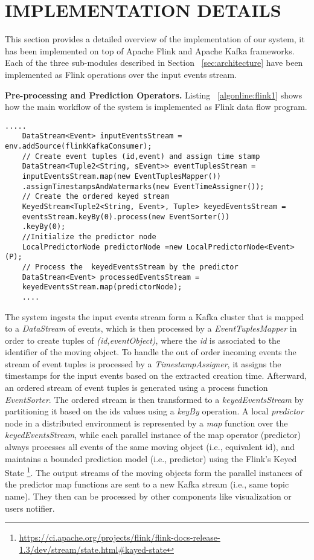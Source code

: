 

\section{IMPLEMENTATION DETAILS}
\label{sec:impl}
This section provides a detailed overview of the  implementation of our system, it has been implemented on top of Apache Flink and Apache Kafka frameworks. Each of the three sub-modules described in Section ~\ref{sec:architecture} have been implemented as Flink operations over the input events stream. 

\textbf{Pre-processing and Prediction Operators.} Listing ~\ref{algonline:flink1} shows how the main workflow of the system is implemented as Flink data flow program.


	\begin{lstlisting}[caption={Flink pipeline for local predictors workflow},label={algonline:flink1},frame=single]
	.....
	DataStream<Event> inputEventsStream = env.addSource(flinkKafkaConsumer);	
	// Create event tuples (id,event) and assign time stamp 
	DataStream<Tuple2<String, sEvent>> eventTuplesStream =
	inputEventsStream.map(new EventTuplesMapper())
	.assignTimestampsAndWatermarks(new EventTimeAssigner());	
	// Create the ordered keyed stream 
	KeyedStream<Tuple2<String, Event>, Tuple> keyedEventsStream =
	eventsStream.keyBy(0).process(new EventSorter())
	.keyBy(0);	
	//Initialize the predictor node 
	LocalPredictorNode predictorNode =new LocalPredictorNode<Event>(P);
	// Process the  keyedEventsStream by the predictor 
	DataStream<Event> processedEventsStream =
	keyedEventsStream.map(predictorNode);
	....
	\end{lstlisting}
	
The system ingests the input events stream form a Kafka cluster that is mapped to a \textit{DataStream} of events, which is then processed by a \textit{EventTuplesMapper} in order to create tuples of \textit{(id,eventObject)}, where the \textit{id} is associated to the identifier of the moving object. To handle the out of order incoming events the stream of event tuples  is processed by a \textit{TimestampAssigner}, it assigns the timestamps for the input events based on the extracted creation time. Afterward,  an ordered stream of event tuples is generated using a process function \textit{EventSorter}. The ordered stream is then transformed to a \textit{keyedEventsStream} by partitioning it based on the ids values using a \textit{keyBy} operation. A local \textit{predictor} node in a distributed environment is represented by a \textit{map} function over the \textit{keyedEventsStream}, while each parallel instance of the map operator (predictor) always processes all events of the same moving object (i.e., equivalent id), and maintains a bounded prediction model (i.e., \pmcmr predictor) using the Flink's Keyed State  \footnote{\url{https://ci.apache.org/projects/flink/flink-docs-release-1.3/dev/stream/state.html\#kayed-state}}.  The output streams of the moving objects form the parallel instances of the predictor map functions are sent to a new Kafka stream (i.e., same topic name).  They then can be processed by other components like visualization or users notifier.


